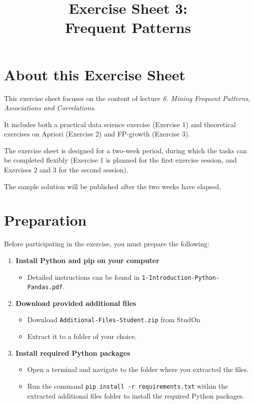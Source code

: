 \documentclass[
english,
smallborders
]{i6prcsht}
\begin{document}
\title{Exercise Sheet 3: \\ Frequent Patterns}
\maketitle
\vspace*{-2cm}

\section*{About this Exercise Sheet}

This exercise sheet focuses on the content of lecture \textit{6. Mining Frequent Patterns, Associations and Correlations}.

It includes both a practical data science exercise (Exercise 1) and theoretical exercises on Apriori (Exercise 2) and FP-growth (Exercise 3).

The exercise sheet is designed for a two-week period, during which the tasks can be completed flexibly (Exercise 1 is planned for the first exercise session, and Exercises 2 and 3 for the second session).

The sample solution will be published after the two weeks have elapsed.

\section*{Preparation}

Before participating in the exercise, you must prepare the following:

\begin{enumerate}
	\item \textbf{Install Python and pip on your computer}

	      \begin{itemize}
		      \item Detailed instructions can be found in \texttt{1-Introduction-Python-Pandas.pdf}.
	      \end{itemize}

	\item \textbf{Download provided additional files}

	      \begin{itemize}
		      \item Download \texttt{Additional-Files-Student.zip} from StudOn
		      \item Extract it to a folder of your choice.
	      \end{itemize}

	\item \textbf{Install required Python packages}

	      \begin{itemize}
		      \item Open a terminal and navigate to the folder where you extracted the files.
		      \item Run the command \texttt{pip install -r requirements.txt} within the extracted additional files folder to install the required Python packages.
	      \end{itemize}


\end{enumerate}
\end{document}
